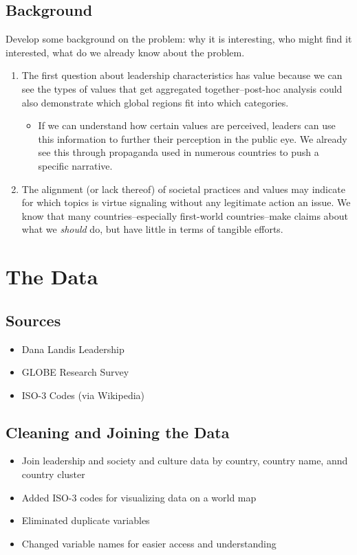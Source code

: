 \documentclass{article}
\begin{document}
\subsection{Background}

Develop some background on the problem: why it is interesting, who might find it interested, what do we already know about the problem.

\begin{enumerate}
    \item The first question about leadership characteristics has value because we can see the types of values that get aggregated together--post-hoc analysis could also demonstrate which global regions fit into which categories.
    \begin{itemize}
        \item If we can understand how certain values are perceived, leaders can use this information to further their perception in the public eye. We already see this through propaganda used in numerous countries to push a specific narrative.
    \end{itemize}
    \item The alignment (or lack thereof) of societal practices and values may indicate for which topics is virtue signaling without any legitimate action an issue. We know that many countries--especially first-world countries--make claims about what we \textit{should} do, but have little in terms of tangible efforts.
\end{enumerate}


\section{The Data}
\subsection{Sources}
\begin{itemize}
    \item Dana Landis Leadership
    \item GLOBE Research Survey
    \item ISO-3 Codes (via Wikipedia)
\end{itemize}
\subsection{Cleaning and Joining the Data}
\begin{itemize}
    \item Join leadership and society and culture data by country, country name, annd country cluster
    \item Added ISO-3 codes for visualizing data on a world map
    \item Eliminated duplicate variables
    \item Changed variable names for easier access and understanding
\end{itemize}
\end{document}
